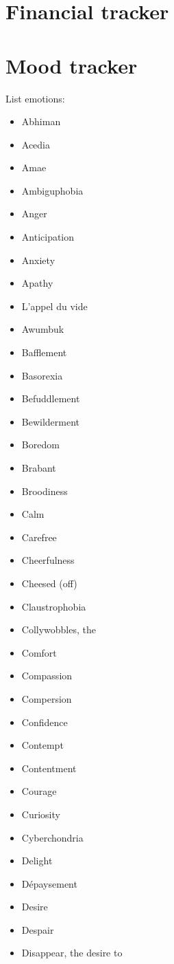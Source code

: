 \documentclass[a5paper]{article}
\begin{document}
\section{Financial tracker}

\section{Mood tracker}
List emotions:
\begin{itemize}
	\item Abhiman
	\item Acedia
	\item Amae
	\item Ambiguphobia
	\item Anger
	\item Anticipation
	\item Anxiety
	\item Apathy
	\item L’appel du vide
	\item Awumbuk
	\item Bafflement
	\item Basorexia
	\item Befuddlement
	\item Bewilderment
	\item Boredom
	\item Brabant
	\item Broodiness
	\item Calm
	\item Carefree
	\item Cheerfulness
	\item Cheesed (off)
	\item Claustrophobia
	\item Collywobbles, the
	\item Comfort
	\item Compassion
	\item Compersion
	\item Confidence
	\item Contempt
	\item Contentment
	\item Courage
	\item Curiosity
	\item Cyberchondria
	\item Delight
	\item Dépaysement
	\item Desire
	\item Despair
	\item Disappear, the desire to

\end{itemize}
\end{document}
